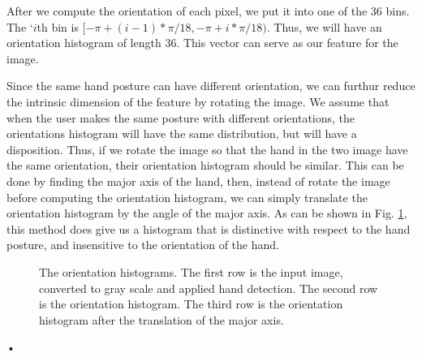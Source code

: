 After we compute the orientation of each pixel, we put it into one of the $36$ bins. The `$i$th bin is $[-\pi+(i-1)*\pi/18, -\pi+i*\pi/18)$. Thus, we will have an orientation histogram of length $36$. This vector can serve as our feature for the image. 

Since the same hand posture can have different orientation, we can furthur reduce the intrinsic dimension of the feature by rotating the image. We assume that when the user makes the same posture with different orientations, the orientations histogram will have the same distribution, but will have a disposition. Thus, if we rotate the image so that the hand in the two image have the same orientation, their orientation histogram should be similar. This can be done by finding the major axis of the hand, then, instead of rotate the image before computing the orientation histogram, we can simply translate the orientation histogram by the angle of the major axis. As can be shown in Fig. \ref{fig:or_hist}, this method does give us a histogram that is distinctive with respect to the hand posture, and insensitive to the orientation of the hand. 
\begin{figure}

\caption{The orientation histograms. The first row is the input image, converted to gray scale and applied hand detection. The second row is the orientation histogram. The third row is the orientation histogram after the translation of the major axis.}
\label{fig:or_hist}
\end{figure}•

